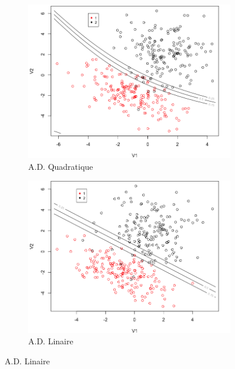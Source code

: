 \documentclass[a4paper,10pt]{report}
\begin{document}
\begin{figure}[H]
	\centering
	\captionsetup{justification=centering, margin=2cm}
	\begin{subfigure}[b]{0.45\linewidth}
		\centering
		\captionsetup{justification=centering, margin=1cm}
		\includegraphics[width=1\linewidth]{img/front-decision-synth-1-adq}
		\caption{\small A.D. Quadratique}
		\label{fig:front-decision-synth-1-adq}%
	\end{subfigure}%
	\begin{subfigure}[b]{0.45\linewidth}
		\centering
		\captionsetup{justification=centering, margin=1cm}
		\includegraphics[width=1\linewidth]{img/front-decision-synth-1-adl}
		\caption{\small A.D. Linaire}
		\label{fig:front-decision-synth-1-adl}%

\end{subfigure}
\end{figure}
\end{document}
